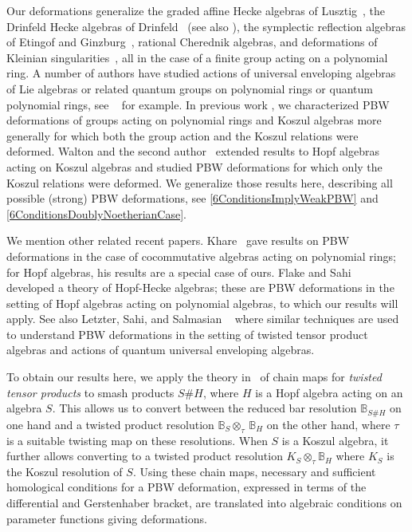 \documentclass[11pt]{amsart}
\numberwithin{equation}{section}
\newcommand{\BB}{\mathbb{B}} %
\renewcommand{\_}[1]{\mbox{$_{\left( #1 \right)}$}}
\newcommand{\ot}{\otimes}
\newcommand{\ott}{\otimes_{\tau}}
\newcommand{\Ho}{H}%
\begin{document}
Our deformations generalize the graded affine
Hecke algebras of Lusztig~\cite{Lusztig88,Lusztig89},
the Drinfeld Hecke algebras of Drinfeld~\cite{Drinfeld} (see also \cite{RamShepler}), the symplectic reflection algebras of 
Etingof and Ginzburg~\cite{EG}, rational Cherednik algebras, and deformations
of Kleinian singularities~\cite{CBH98}, all in the case of a finite group
acting on a polynomial ring.
A number of authors have studied actions of universal enveloping algebras
of Lie algebras or related quantum groups on polynomial rings or quantum
polynomial rings, see ~\cite{EGG05,GK07,KT10,Tsy} for example.
In previous work \cite{SW-Koszul}, we characterized PBW deformations of groups acting on polynomial rings and
Koszul algebras more generally for
which both the group action and the Koszul relations were
deformed.
Walton and the second author~\cite{WW} extended results to Hopf
algebras acting 
on Koszul algebras and studied PBW deformations for which only
the Koszul relations were deformed.
We generalize those results here, describing all possible 
(strong) PBW deformations, see
\cref{6ConditionsImplyWeakPBW}
and \cref{6ConditionsDoublyNoetherianCase}.

We mention other related recent papers.
Khare~\cite{Khare} gave results on
PBW deformations in the case of cocommutative algebras acting on polynomial rings;
for Hopf algebras, his results are a 
special case of ours. 
Flake and Sahi~\cite{Flake19,FlakeSahi} developed a theory of Hopf-Hecke algebras;
these are PBW deformations in the setting of Hopf algebras acting
on polynomial algebras, to which our results will apply. 
See also Letzter, Sahi, and Salmasian ~\cite[Section 8]{LSS} where similar techniques are used to
understand PBW deformations in the setting of twisted tensor product algebras
and actions of quantum universal enveloping algebras. 

To obtain our results here, we apply the 
theory in~\cite{TTP-AWEZ}   of chain maps for {\em twisted tensor products}
to smash products $S\# H$,
where $H$ is a Hopf algebra acting on an algebra $S$.
This allows us to convert between
the reduced bar resolution $\BB_{S\# H}$ on one hand
and a twisted product resolution $\BB_{S}\ott\,\BB_{\Ho} $
on the other hand, where $\tau$ is a suitable twisting map on these resolutions.
When $S$ is a Koszul algebra, it further allows converting to a twisted product
resolution $K_S\ot_{\tau}\BB_H$ where $K_S$ is the Koszul resolution of $S$.
Using these chain maps, necessary and sufficient homological conditions for a PBW deformation,
expressed in terms of the differential and Gerstenhaber bracket,
are translated into algebraic conditions on parameter functions giving
deformations.
\end{document}
